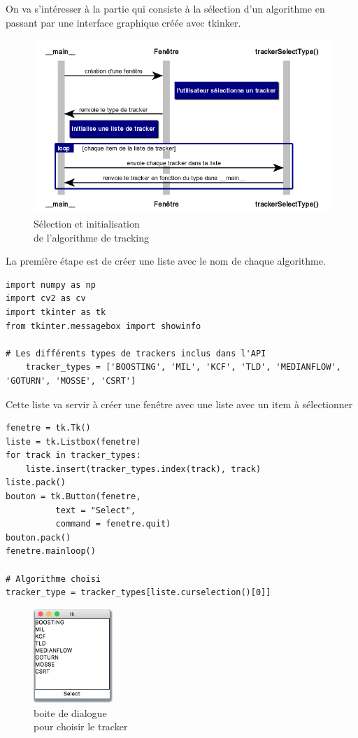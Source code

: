 
On va s’intéresser à la partie qui consiste à la sélection d’un algorithme en passant par une interface graphique créée avec tkinker.

\begin{figure}[H]
  \includegraphics[width=14cm]{img/diag_seq.png}
    \centering
    \caption{Sélection et initialisation\\ de l'algorithme de tracking}
\end{figure}
La première étape est de créer une liste avec le nom de chaque algorithme.

  \begin{verbatim}
import numpy as np
import cv2 as cv
import tkinter as tk
from tkinter.messagebox import showinfo

# Les différents types de trackers inclus dans l'API
    tracker_types = ['BOOSTING', 'MIL', 'KCF', 'TLD', 'MEDIANFLOW', 'GOTURN', 'MOSSE', 'CSRT']
\end{verbatim}

Cette liste va servir à créer une fenêtre avec une liste avec un item à sélectionner

\begin{verbatim}
fenetre = tk.Tk()
liste = tk.Listbox(fenetre)
for track in tracker_types:
    liste.insert(tracker_types.index(track), track)
liste.pack()
bouton = tk.Button(fenetre,
          text = "Select",
          command = fenetre.quit)
bouton.pack()
fenetre.mainloop()

# Algorithme choisi
tracker_type = tracker_types[liste.curselection()[0]]
\end{verbatim}
\begin{figure}[H]
  \includegraphics[width=3cm]{img/trackerbox.png}
    \centering
    \caption{boite de dialogue\\pour choisir le tracker}
\end{figure}

